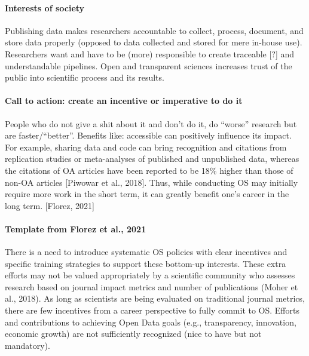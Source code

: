 \paragraph{Interests of society}

%
Publishing data makes researchers accountable to collect, process, document, and
store data properly (opposed to data collected and stored for mere in-house
use).
%
Researchers want and have to be (more) responsible to create traceable [?] and
understandable pipelines.
%
Open and transparent sciences increases trust of the public into scientific
process and its results.



\paragraph{Call to action: create an incentive or imperative to do it}


%
People who do not give a shit about it and don't do it, do ``worse'' research
but are faster/``better''.
%
Benefits like: accessible can positively influence its impact. For example,
sharing data and code can bring recognition and citations from replication
studies or meta-analyses of published and unpublished data, whereas the
citations of OA articles have been reported to be 18\% higher than those of
non-OA articles [Piwowar et al., 2018].
%
Thus, while conducting OS may initially require more work in the short term, it
can greatly benefit one’s career in the long term. [Florez, 2021]



\paragraph{Template from Florez et al., 2021}


%
There is a need to introduce systematic OS policies with clear incentives and
specific training strategies to support these bottom-up interests.
%
These extra efforts may not be valued appropriately by a scientific community
who assesses research based on journal impact metrics and number of publications
(Moher et al., 2018).
%
As long as scientists are being evaluated on traditional journal metrics, there
are few incentives from a career perspective to fully commit to OS.
%
Efforts and contributions to achieving Open Data goals (e.g., transparency,
innovation, economic growth) are not sufficiently recognized (nice to have but
not mandatory).



